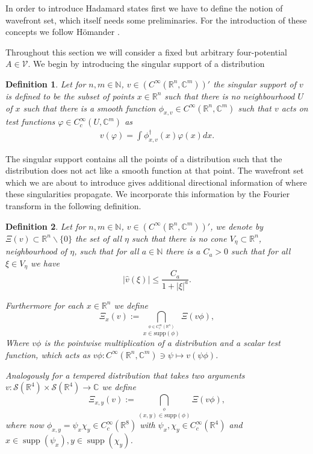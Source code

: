 \documentclass[b5paper,draft,openbib,12pt]{memoir}
\newtheorem{Def}{Definition}
\DeclareMathOperator*{\supp}{supp}
\begin{document}
In order to introduce Hadamard states first we have to define 
the notion of wavefront set, which itself needs some preliminaries. 
For the introduction of these concepts we follow 
Hömander \cite[Chapter 8]{hormander2003analysis}.

Throughout this section we will consider a fixed but 
arbitrary four-potential \(A\in\mathcal{V}\).
We begin by introducing the singular support of a distribution

\begin{Def}
Let for \(n,m\in\mathbb{N}\),  \(v\in (C^\infty(\mathbb{R}^n,\mathbb{C}^m))'\) the singular support of \(v\) is defined to be the subset of points \(x\in \mathbb{R}^n\) such
that there is no neighbourhood \(U\) of \(x\) such that there is a smooth function \(\phi_{x,v}\in C^\infty (\mathbb{R}^n,\mathbb{C}^m)\) such that \(v\) acts on 
test functions \(\varphi \in C^\infty_c (U,\mathbb{C}^m)\) as
\begin{align}
v(\varphi)=\int \phi^\dagger_{x,v} (x) \varphi(x) dx.
\end{align}
\end{Def}

The singular support contains all the points of a 
distribution such that the distribution does not act like 
a smooth function at that point. The wavefront set which we are
about to introduce gives additional directional information 
of where these singularities propagate. We incorporate this 
information by the Fourier transform 
in the following definition.

\begin{Def}
Let for \(n,m\in\mathbb{N}\),  \(v\in (C^\infty(\mathbb{R}^n,
\mathbb{C}^m))'\), we denote by \(\Xi(v)\subset \mathbb{R}^n
\backslash\{0\}\) the set of all \(\eta\) such that there is no
cone \(V_\eta\subset \mathbb{R}^n\), neighbourhood of \(\eta\), 
such that for all \(a\in\mathbb{N}\) there is a \(C_a>0\) such that for 
all \(\xi\in V_\eta\) we have
\begin{equation}
|\hat{v}(\xi)|\le \frac{C_a}{1+|\xi|^a}.
\end{equation}

Furthermore for each \(x\in \mathbb{R}^n\) we define 
\begin{equation}
\Xi_x (v) := \bigcap_{\overset{\phi \in C^\infty_c (\mathbb{R}^n)}{x\in \mathrm{supp}(\phi)}} \Xi(v \phi),
\end{equation}
Where \(v\phi\) is the pointwise multiplication of a distribution and a scalar test function, which acts as 
\(v\phi: C^\infty(\mathbb{R}^n,\mathbb{C}^m)\ni \psi\mapsto v(\psi \phi)\). 

Analogously for a tempered distribution that takes two arguments 
\(v:\mathcal{S}(\mathbb{R}^4)\times \mathcal{S}(\mathbb{R}^4)\rightarrow \mathbb{C}\)
we define 
\begin{equation}
  \Xi_{x,y} (v) := \bigcap_{\overset{\phi}{(x,y)\in \mathrm{supp}(\phi)}} \Xi(v \phi), 
\end{equation}
where now \(\phi_{x,y}=\psi_{x} \chi_y\in C_c^\infty(\mathbb{R}^8)\)
with \(\psi_{x} ,\chi_y\in C_c^\infty(\mathbb{R}^4)\)  and \(x\in\supp(\psi_x), y\in\supp(\chi_y)\).
\end{Def}
\end{document}
